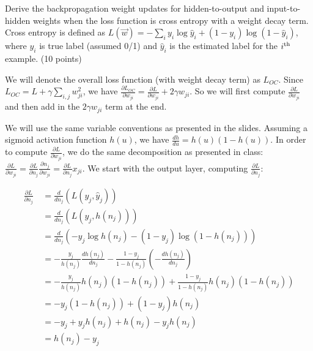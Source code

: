 \documentclass[fleqn]{homework}
\begin{document}
  \begin{problem}{5}
    \begin{question}
      Derive the backpropagation weight updates for hidden-to-output and
      input-to-hidden weights when the loss function is cross entropy with a
      weight decay term.  Cross entropy is defined as
      $L(\vec{w}) = -\sum_i y_i \log \hat{y}_i + (1-y_i)\log(1-\hat{y}_i)$,
      where $y_i$ is true label (assumed 0/1) and $\hat{y}_i$ is the estimated
      label for the $i\textsuperscript{th}$ example. (10 points)
    \end{question}

    We will denote the overall loss function (with weight decay term) as
    $L_{OC}$.  Since $L_{OC} = L + \gamma \sum_{i,j} w_{ji}^2$, we have
    $\frac{\partial L_{OC}}{\partial w_{ji}} = \frac{\partial L}{\partial
      w_{ji}} + 2 \gamma w_{ji}$.
    So we will first compute $\frac{\partial L}{\partial w_{ji}}$ and then add
    in the $2\gamma w_{ji}$ term at the end.

    We will use the same variable conventions as presented in the slides.
    Assuming a sigmoid activation function $h(u)$, we have
    $\frac{dh}{du} = h(u)(1-h(u))$.  In order to compute
    $\frac{\partial L}{\partial w_{ji}}$, we do the same decomposition as
    presented in class:
    $\frac{\partial L}{\partial w_{ji}} = \frac{\partial L}{\partial n_{j}}
    \frac{\partial n_j}{\partial w_{ji}} = \frac{\partial L}{\partial n_j}
    x_{ji}$.
    We start with the output layer, computing $\frac{\partial L}{\partial n_j}$:

    \begin{align*}
      \frac{\partial L}{\partial n_j}\
      &= \frac{d}{dn_j} \left(L(y_j, \hat{y}_j) \right)\\
      &= \frac{d}{dn_j} \left(L(y_j, h(n_j)) \right)\\
      &= \frac{d}{dn_j} \left(-y_j \log h(n_j) - (1-y_j)\log(1-h(n_j)) \right)\\
      &= -\frac{y_j}{h(n_j)} \frac{dh(n_j)}{dn_j} - \frac{1-y_j}{1-h(n_j)} \left(- \frac{dh(n_j)}{dn_j}\right)\\
      &= -\frac{y_j}{h(n_j)} h(n_j)(1-h(n_j)) + \frac{1-y_j}{1-h(n_j)} h(n_j)(1-h(n_j))\\
      &= -y_j (1-h(n_j)) + (1-y_j)h(n_j)\\
      &= -y_j + y_j h(n_j) + h(n_j) - y_j h(n_j) \\
      &= h(n_j) - y_j
    \end{align*}


\end{problem}
\end{document}
